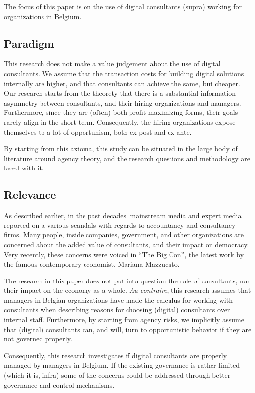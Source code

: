 \documentclass[12pt]{article}
\begin{document}
The focus of this paper is on the use of digital consultants (supra)
working for organizations in Belgium.

\subsection{Paradigm}\label{paradigm}

This research does not make a value judgement about the use of digital
consultants. We assume that the transaction costs for building digital
solutions internally are higher, and that consultants can achieve the
same, but cheaper. Our research starts from the theorety that there is a
substantial information asymmetry between consultants, and their hiring
organizations and managers. Furthermore, since they are (often) both
profit-maximizing forms, their goals rarely align in the short term.
Consequently, the hiring organizations expose themselves to a lot of
opportunism, both ex post and ex ante.

By starting from this axioma, this study can be situated in the large
body of literature around agency theory, and the research questions and
methodology are laced with it.

\subsection{Relevance}\label{relevance}

As described earlier, in the past decades, mainstream media and expert
media reported on a various scandals with regards to accountancy and
consultancy firms. Many people, inside companies, government, and other
organizations are concerned about the added value of consultants, and
their impact on democracy. Very recently, these concerns were voiced in
``The Big Con'', the latest work by the famous contemporary economist,
Mariana Mazzucato.

The research in this paper does not put into question the role of
consultants, nor their impact on the economy as a whole. \emph{Au
contraire}, this research assumes that managers in Belgian organizations
have made the calculus for working with consultants when describing
reasons for choosing (digital) consultants over internal staff.
Furthermore, by starting from agency risks, we implicitly assume that
(digital) consultants can, and will, turn to opportunistic behavior if
they are not governed properly.

Consequently, this research investigates if digital consultants are
properly managed by managers in Belgium. If the existing governance is
rather limited (which it is, infra) some of the concerns could be
addressed through better governance and control mechanisms.
\end{document}
